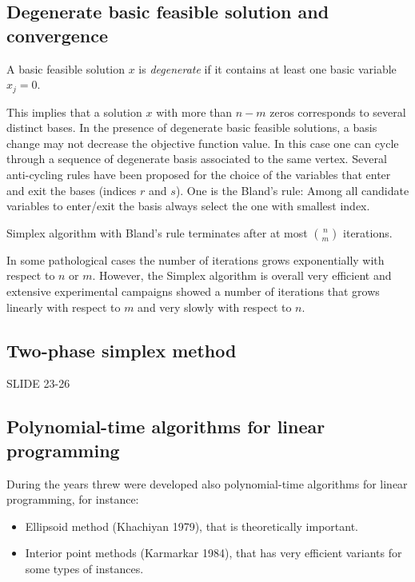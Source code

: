 \subsection*{Degenerate basic feasible solution and convergence}
\begin{definition}
    A basic feasible solution $x$ is \emph{degenerate} if it contains at least one basic variable $x_j=0$.
\end{definition}
This implies that a solution $x$ with more than $n-m$ zeros corresponds to several distinct bases. 
In the presence of degenerate basic feasible solutions, a basis change may not decrease the objective function value. 
In this case one can cycle through a sequence of degenerate basis associated to the same vertex. 
Several anti-cycling rules have been proposed for the choice of the variables that enter and exit the bases (indices $r$ and $s$). 
One is the Bland's rule: Among all candidate variables to enter/exit the basis always select the one with smallest index. 
\begin{proposition}
 Simplex algorithm with Bland's rule terminates after at most $\binom{n}{m}$ iterations. 
\end{proposition}
In some pathological cases the number of iterations grows exponentially with respect to $n$ or $m$. 
However, the Simplex algorithm is overall very efficient and extensive experimental campaigns showed a number of iterations that grows linearly with respect to $m$ and very slowly with respect to $n$. 

\subsection*{Two-phase simplex method}
SLIDE 23-26

\subsection*{Polynomial-time algorithms for linear programming}
During the years threw were developed also polynomial-time algorithms for linear programming, for instance: 
\begin{itemize}
    \item Ellipsoid method (Khachiyan 1979), that is theoretically important. 
    \item Interior point methods (Karmarkar 1984), that has very efficient variants for some types of instances. 
\end{itemize}